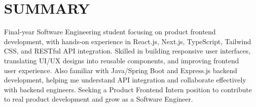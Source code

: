 \section{SUMMARY}
\small
\noindent Final-year Software Engineering student focusing on product frontend development, with hands-on experience in React.js, Next.js, TypeScript, Tailwind CSS, and RESTful API integration. Skilled in building responsive user interfaces, translating UI/UX designs into reusable components, and improving frontend user experience. Also familiar with Java/Spring Boot and Express.js backend development, helping me understand API integration and collaborate effectively with backend engineers. Seeking a Product Frontend Intern position to contribute to real product development and grow as a Software Engineer.

\normalsize
